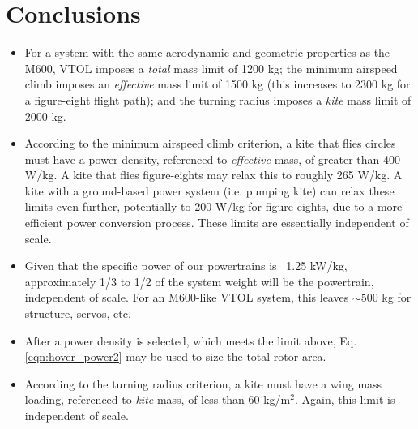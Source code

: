\documentclass[11pt]{amsart}
\newcommand{\kite}{\mathrm{kite}}
\newcommand{\mx}{\mathrm{max}}
\newcommand{\prop}{\mathrm{prop}}
\newcommand{\mass}{\mathrm{mass}}
\begin{document}
{{{%






\section{Conclusions}

\begin{itemize}

\item For a system with the same aerodynamic and geometric properties
  as the M600, VTOL imposes a {\it total} mass limit of 1200 kg; the
  minimum airspeed climb imposes an {\it effective} mass limit of 1500
  kg (this increases to 2300 kg for a figure-eight flight path); and
  the turning radius imposes a {\it kite} mass limit of 2000 kg.

\item According to the minimum airspeed climb criterion, a kite that
  flies circles must have a power density, referenced to {\it
    effective} mass, of greater than 400 W/kg.  A kite that flies
  figure-eights may relax this to roughly 265 W/kg.  A kite with a
  ground-based power system (i.e. pumping kite) can relax these limits
  even further, potentially to 200 W/kg for figure-eights, due to a
  more efficient power conversion process. These limits are
  essentially independent of scale.

\item Given that the specific power of our powertrains is ~1.25 kW/kg,
  approximately 1/3 to 1/2 of the system weight will be the
  powertrain, independent of scale.  For an M600-like VTOL system,
  this leaves $\sim 500$ kg for structure, servos, etc.

\item After a power density is selected, which meets the limit above,
  Eq. \ref{eqn:hover_power2} may be used to size the total rotor area.

\item According to the turning radius criterion, a kite must have a
  wing mass loading, referenced to {\it kite} mass, of less than 60
  kg/m$^2$.  Again, this limit is independent of scale.


\end{itemize}}}}
\end{document}
